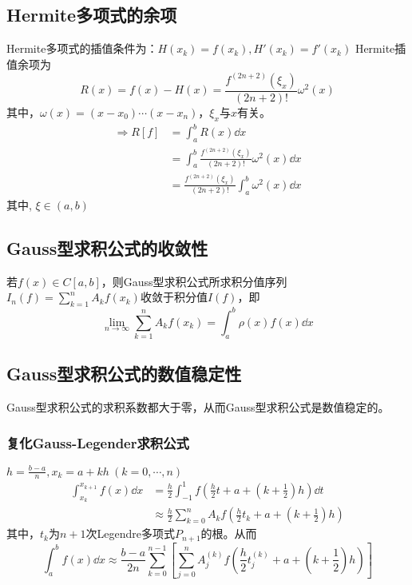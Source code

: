 \subsection{Hermite多项式的余项}
Hermite多项式的插值条件为：$H(x_k) = f(x_k),H'(x_k) = f'(x_k)$
Hermite插值余项为
\begin{equation*}
    R(x) = f(x) - H(x) = \frac{f^{(2n+2)}(\xi_x)}{(2n+2)!}\omega^2(x)
\end{equation*}
其中，$\omega(x) = (x-x_0)\cdots (x-x_n)$，$\xi_x$与$x$有关。
\begin{align*}
    \Rightarrow R[f] &= \int_{a}^{b}R(x)\dd{x} \\
    &= \int_{a}^{b}\frac{f^{(2n+2)}(\xi_x)}{(2n+2)!}\omega^2(x)\dd{x} \\
    &= \frac{f^{(2n+2)}(\xi_x)}{(2n+2)!}\int_{a}^{b}\omega^2(x)\dd{x}
\end{align*}
其中, $\xi \in (a,b)$
\subsection{Gauss型求积公式的收敛性}

\begin{theorem}
    若$f(x) \in C[a,b]$，则Gauss型求积公式所求积分值序列${I_n(f) = \sum_{k=1}^{n}A_kf(x_k)}$收敛于积分值$I(f)$，即
    \begin{equation*}
        \lim_{n\to\infty}\sum_{k=1}^{n}A_kf(x_k) = \int_{a}^{b}\rho(x)f(x)\dd{x}
    \end{equation*}
\end{theorem}

\subsection{Gauss型求积公式的数值稳定性}

\begin{theorem}
    Gauss型求积公式的求积系数都大于零，从而Gauss型求积公式是数值稳定的。
\end{theorem}

\subsubsection{复化Gauss-Legender求积公式}

$h = \frac{b-a}{n},x_k = a+kh \   (k=0,\cdots ,n)$
\begin{align*}
    \int_{x_k}^{x_{k+1}}f(x)\dd{x} &= \frac{h}{2}\int_{-1}^{1}f(\frac{h}{2}t+a+(k+\frac{1}{2})h)\dd{t} \\
    &\approx \frac{h}{2}\sum_{k=0}^{n}A_kf(\frac{h}{2}t_k+a+(k+\frac{1}{2})h)
\end{align*}
其中，$t_k$为$n+1$次Legendre多项式$P_{n+1}$的根。从而
\begin{equation*}
    \int_{a}^{b}f(x)\dd{x} \approx \frac{b-a}{2n}\sum_{k=0}^{n-1}[\sum_{j=0}^{n}A_j^{(k)}f(\frac{h}{2}t_j^{(k)}+a+(k+\frac{1}{2})h)]
\end{equation*}

